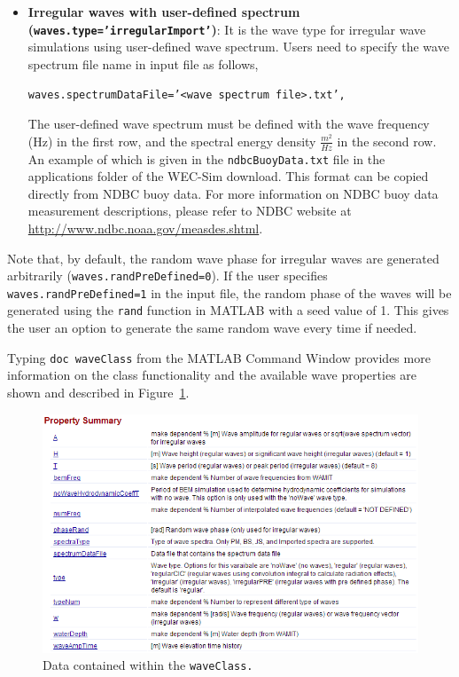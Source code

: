 \begin{itemize}
\item \textbf{Irregular waves with user-defined spectrum (\texttt{waves.type='irregularImport'})}:  It is the wave type for irregular wave simulations using user-defined wave spectrum. Users need to specify the wave spectrum file name in input file as follows,

\begin{center}\texttt{\qquad{}waves.spectrumDataFile='<wave spectrum file>.txt',}\end{center}

The user-defined wave spectrum must be defined with the wave frequency (Hz) in the first row, and the spectral energy density $\frac{m^2}{Hz}$ in the second row. An example of which is given in the \texttt{ndbcBuoyData.txt} file in the applications folder of the WEC-Sim download. This format can be copied directly from NDBC buoy data. For more information on NDBC buoy data measurement descriptions, please refer to NDBC website at \href{http://www.ndbc.noaa.gov/measdes.shtml}{http://www.ndbc.noaa.gov/measdes.shtml}.\\
\end{itemize}

Note that, by default, the random wave phase for irregular waves are generated arbitrarily (\texttt{waves.randPreDefined=0}). If the user specifies \texttt{waves.randPreDefined=1} in the input file, the random phase of the waves will be generated using the \texttt{rand} function in MATLAB with a seed value of  1. This gives the user an option to generate the same random wave every time if needed. 

Typing \texttt{doc waveClass} from the MATLAB Command Window provides more information on the class functionality and the available wave properties are shown and described in Figure~\ref{fig:waveClass}.

\begin{figure}[h]
\centering
\includegraphics[width=1\textwidth]{codeStruct/images/waveClass}
\caption{Data contained within the \texttt{waveClass.}}
\label{fig:waveClass}
\end{figure}

